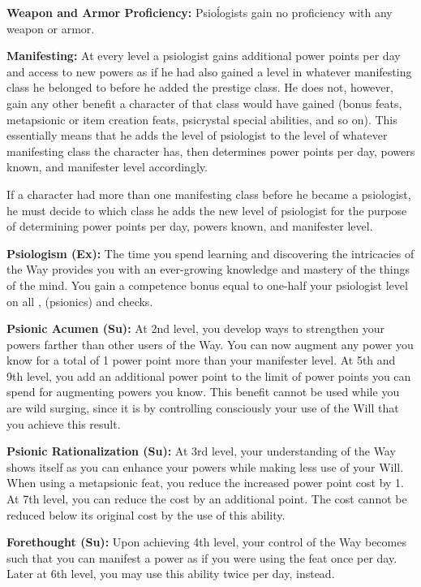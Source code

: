 {
\textbf{Weapon and Armor Proficiency:} Psioĺogists gain no proficiency with any weapon or armor.

\textbf{Manifesting:} At every level a psiologist gains additional power points per day and access to new powers as if he had also gained a level in whatever manifesting class he belonged to before he added the prestige class. He does not, however, gain any other benefit a character of that class would have gained (bonus feats, metapsionic or item creation feats, psicrystal special abilities, and so on). This essentially means that he adds the level of psiologist to the level of whatever manifesting class the character has, then determines power points per day, powers known, and manifester level accordingly.

If a character had more than one manifesting class before he became a psiologist, he must decide to which class he adds the new level of psiologist for the purpose of determining power points per day, powers known, and manifester level.

\textbf{Psiologism (Ex):} The time you spend learning and discovering the intricacies of the Way provides you with an ever-growing knowledge and mastery of the things of the mind. You gain a competence bonus equal to one-half your psiologist level on all ,  (psionics) and  checks.

\textbf{Psionic Acumen (Su):} At 2nd level, you develop ways to strengthen your powers farther than other users of the Way. You can now augment any power you know for a total of 1 power point more than your manifester level. At 5th and 9th level, you add an additional power point to the limit of power points you can spend for augmenting powers you know. This benefit cannot be used while you are wild surging, since it is by controlling consciously your use of the Will that you achieve this result.

\textbf{Psionic Rationalization (Su):} At 3rd level, your understanding of the Way shows itself as you can enhance your powers while making less use of your Will. When using a metapsionic feat, you reduce the increased power point cost by 1. At 7th level, you can reduce the cost by an additional point. The cost cannot be reduced below its original cost by the use of this ability.

\textbf{Forethought (Su):} Upon achieving 4th level, your control of the Way becomes such that you can manifest a power as if you were using the  feat once per day. Later at 6th level, you may use this ability twice per day, instead.

}

